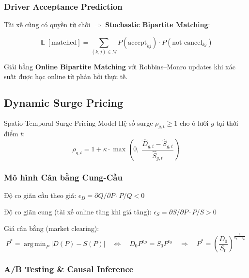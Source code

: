 \documentclass[12pt,a4paper]{article}
\DeclareMathOperator{\argmin}{arg\,min}
\DeclareMathOperator*{\E}{\mathbb{E}}
\begin{document}
\subsubsection{Driver Acceptance Prediction}

Tài xế cũng có quyền từ chối $\Rightarrow$ \textbf{Stochastic Bipartite Matching}:

\begin{equation}
  \E[\text{matched}] = \sum_{(k,j)\in M} P(\text{accept}_{kj})\cdot P(\text{not cancel}_{kj})
\end{equation}

Giải bằng \textbf{Online Bipartite Matching} với Robbins--Monro updates khi xác suất
được học online từ phản hồi thực tế.

\subsection{Dynamic Surge Pricing}

\begin{ridebox}{Spatio-Temporal Surge Pricing Model}
Hệ số surge $\rho_{g,t}\geq 1$ cho ô lưới $g$ tại thời điểm $t$:
\begin{equation}
  \rho_{g,t} = 1 + \kappa\cdot\max\!\left(0,\;\frac{\hat{D}_{g,t}-\hat{S}_{g,t}}{\hat{S}_{g,t}}\right)
\end{equation}
\end{ridebox}

\subsubsection{Mô hình Cân bằng Cung-Cầu}

Độ co giãn cầu theo giá:
$\epsilon_D = \partial Q/\partial P\cdot P/Q < 0$

Độ co giãn cung (tài xế online tăng khi giá tăng):
$\epsilon_S = \partial S/\partial P\cdot P/S > 0$

Giá cân bằng (market clearing):
\begin{equation}
  P^* = \argmin_P\left|D(P) - S(P)\right|
  \quad\Leftrightarrow\quad
  D_0 P^{\epsilon_D} = S_0 P^{\epsilon_S}
  \quad\Rightarrow\quad
  P^* = \left(\frac{D_0}{S_0}\right)^{\frac{1}{\epsilon_S-\epsilon_D}}
\end{equation}

\subsubsection{A/B Testing \& Causal Inference}
\end{document}
